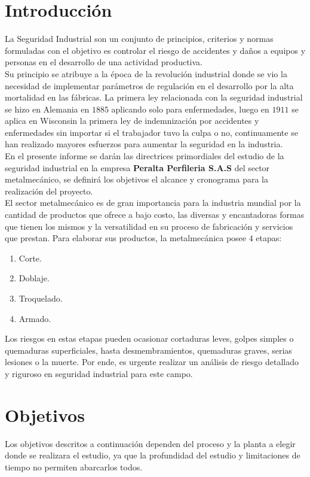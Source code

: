 \documentclass[11pt,graphicx,caption,rotating]{article}
\begin{document}
\section{Introducción}
\noindent
La Seguridad Industrial son un conjunto de principios, criterios y normas formuladas con el objetivo es controlar el riesgo de accidentes y daños a equipos y personas en el desarrollo de una actividad productiva.\\
Su principio se atribuye a la época de la revolución industrial donde  se vio la necesidad de implementar parámetros de regulación en el desarrollo por la alta mortalidad en las fábricas. La primera ley relacionada con la seguridad industrial se hizo en Alemania en $1885$ aplicando solo para enfermedades, luego en $1911$ se aplica en Wisconsin la primera  ley de indemnización por accidentes y enfermedades sin importar si el trabajador tuvo la culpa o no, continuamente se han realizado mayores esfuerzos para aumentar la seguridad en la industria.\\
En el presente informe se darán las directrices primordiales del estudio de la seguridad industrial en la empresa \textbf{Peralta Perfileria S.A.S} del sector metalmecánico, se definirá los objetivos el alcance y cronograma para la realización del proyecto.\\
El sector metalmecánico es de gran importancia para la industria mundial por la cantidad de productos que ofrece a bajo costo, las diversas y encantadoras formas que tienen los mismos y la versatilidad en su proceso de fabricación y servicios que prestan. Para elaborar sus productos, la metalmecánica posee $4$ etapas:
\begin{enumerate}
  \item Corte.
  \item Doblaje.
  \item Troquelado.
  \item Armado.
\end{enumerate}
\noindent
Los riesgos en estas etapas pueden ocasionar cortaduras leves, golpes simples o quemaduras superficiales, hasta desmembramientos, quemaduras graves, serias lesiones o la muerte. Por ende, es urgente realizar un análisis de riesgo detallado y riguroso en seguridad industrial para este campo.

\section{Objetivos}
\noindent
Los objetivos descritos a continuación dependen del proceso y la planta a elegir donde se realizara el estudio, ya que la profundidad del estudio y limitaciones de tiempo  no permiten abarcarlos todos.
\end{document}
